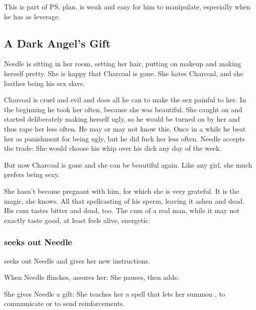 This is part of \ps{\Psyrex}{} plan. 
\Tiroco{} is weak and easy for him to manipulate, especially when he has \Icor{} as leverage. 







\subsection{A Dark Angel's Gift}
Needle is sitting in her room, setting her hair, putting on makeup and making herself pretty. She is happy that Charcoal is gone. She hates Charcoal, and she loathes being his sex slave. 

Charcoal is cruel and evil and does all he can to make the sex painful to her. In the beginning he took her often, because she was beautiful. She caught on and started deliberately making herself ugly, so he would be turned on by her and thus rape her less often. He may or may not know this. Once in a while he beat her as punishment for being ugly, but he did fuck her less often. Needle accepts the trade: She would choose his whip over his dick any day of the week. 

But now Charcoal is gone and she can be beautiful again. Like any girl, she much prefers being sexy. 

She hasn't become pregnant with him, for which she is very grateful. It is the magic, she knows. All that spellcasting  of his sperm, leaving it ashen and dead. His cum tastes bitter and dead, too. The cum of a real man, while it may not exactly taste good, at least feels alive, energetic. 





\subsubsection{\Achsah{} seeks out Needle}
 seeks out Needle and gives her new instructions. 

When Needle flinches, \Achsah{} assures her: 
She pauses, then adds: 

She gives Needle a gift: She teaches her a spell that lets her summon \Achsah{}, to communicate or to send reinforcements. 







